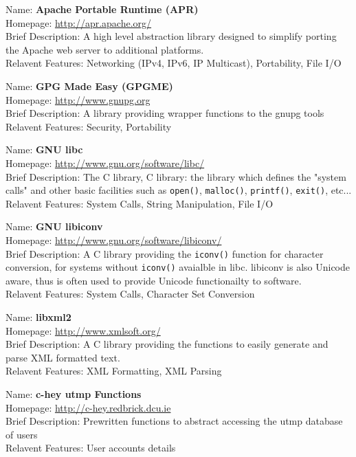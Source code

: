 
Name: 	\textbf{Apache Portable Runtime (APR)} \\
Homepage: 	\url{http://apr.apache.org/}	\\	
Brief Description: 	A high level abstraction library designed to 
simplify porting the Apache web server to additional platforms. \\
Relavent Features: Networking (IPv4, IPv6, IP Multicast), Portability, 
File I/O


Name:		\textbf{GPG Made Easy (GPGME)}	\\
Homepage:		\url{http://www.gnupg.org}	\\
Brief Description: A library providing wrapper functions to the gnupg tools \\
Relavent Features: Security, Portability


Name:		\textbf{GNU libc}	\\	
Homepage:		\url{http://www.gnu.org/software/libc/}	\\
Brief Description: The C library, C library: the library which
defines the "system calls" and other basic facilities such as 
\verb+open()+, \verb+malloc()+, \verb+printf()+, \verb+exit()+, etc... \\
Relavent Features: System Calls, String Manipulation, File I/O


Name:		\textbf{GNU libiconv}	\\	
Homepage:		\url{http://www.gnu.org/software/libiconv/}	\\
Brief Description: A C library providing the \verb+iconv()+ function for
character conversion, for systems without \verb+iconv()+ avaialble in
libc. libiconv is also Unicode aware, thus is often used to provide
Unicode functionailty to software. \\
Relavent Features: System Calls, Character Set Conversion


Name:		\textbf{libxml2}	\\	
Homepage:		\url{http://www.xmlsoft.org/}	\\
Brief Description: A C library providing the functions to easily
generate and parse XML formatted text. \\
Relavent Features: XML Formatting, XML Parsing


Name:		\textbf{c-hey utmp Functions}	\\	
Homepage:		\url{http://c-hey.redbrick.dcu.ie}	\\
Brief Description: Prewritten functions to abstract accessing the utmp
database of users \\
Relavent Features: User accounts details


